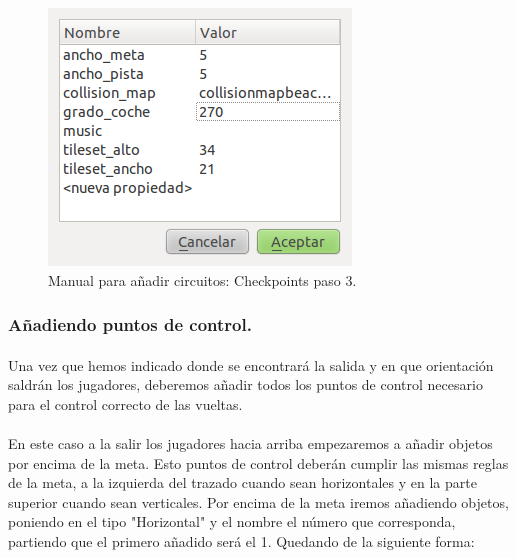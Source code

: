 \begin{figure}[H]
  \label{checkpoints3}
  \begin{center}
    \includegraphics[scale=0.5]{imagenes/manualcircuito/checkpoints3.png}
  \end{center}
  \caption{Manual para añadir circuitos: Checkpoints paso 3.}
\end{figure}

\subsubsection{Añadiendo puntos de control.}

\paragraph{}
Una vez que hemos indicado donde se encontrará la salida y en que orientación saldrán los jugadores, deberemos añadir todos los
puntos de control necesario para el control correcto de las vueltas.

\paragraph{}
En este caso a la salir los jugadores hacia arriba empezaremos a añadir objetos por encima de la meta. Esto puntos de control
deberán cumplir las mismas reglas de la meta, a la izquierda del trazado cuando sean horizontales y en la parte superior cuando
sean verticales. Por encima de la meta iremos añadiendo objetos, poniendo en el tipo "Horizontal" y el nombre el número que 
corresponda, partiendo que el primero añadido será el 1. Quedando de la siguiente forma:

